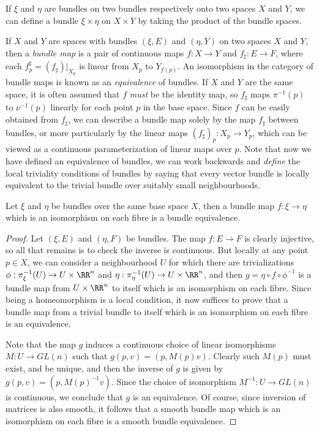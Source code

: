 \begin{example}
    If $\xi$ and $\eta$ are bundles on two bundles respectively onto two spaces $X$ and $Y$, we can define a bundle $\xi \times \eta$ on $X \times Y$ by taking the product of the bundle spaces.
\end{example}

If $X$ and $Y$ are spaces with bundles $(\xi,E)$ and $(\eta,Y)$ on two spaces $X$ and $Y$, then a \emph{bundle map} is a pair of continuous maps $f: X \to Y$ and $f_\sharp: E \to F$, where each $f^\sharp_p = (f_\sharp)|_{X_p}$ is linear from $X_p$ to $Y_{f(p)}$. An isomorphism in the category of bundle maps is known as an \emph{equivalence} of bundles. If $X$ and $Y$ are the same space, it is often assumed that $f$ {\it must} be the identity map, so $f_\sharp$ maps $\pi^{-1}(p)$ to $\nu^{-1}(p)$ linearly for each point $p$ in the base space. Since $f$ can be easily obtained from $f_\sharp$, we can describe a bundle map solely by the map $f_\sharp$ between bundles, or more particularly by the linear maps $(f_\sharp)_p: X_p \to Y_p$, which can be viewed as a continuous parameterization of linear maps over $p$. Note that now we have defined an equivalence of bundles, we can work backwards and {\it define} the local triviality conditions of bundles by saying that every vector bundle is locally equivalent to the trivial bundle over suitably small neighbourhoods.

\begin{theorem}
    Let $\xi$ and $\eta$ be bundles over the same base space $X$, then a bundle map $f: \xi \to \eta$ which is an isomorphism on each fibre is a bundle equivalence.
\end{theorem}
\begin{proof}
    Let $(\xi,E)$ and $(\eta,F)$ be bundles. The map $f: E \to F$ is clearly injective, so all that remains is to check the inverse is continuous. But locally at any point $p \in X$, we can consider a neighbourhood $U$ for which there are trivializations $\phi: \pi_\xi^{-1}(U) \to U \times \RR^n$ and $\eta: \pi_\eta^{-1}(U) \to U \times \RR^n$, and then $g = \eta \circ f \circ \phi^{-1}$ is a bundle map from $U \times \RR^n$ to itself which is an isomorphism on each fibre. Since being a homeomorphism is a local condition, it now suffices to prove that a bundle map from a trivial bundle to itself which is an isomorphism on each fibre is an equivalence.

    Note that the map $g$ induces a continuous choice of linear isomorphisms $M: U \to GL(n)$ such that $g(p,v) = (p,M(p)v)$. Clearly such $M(p)$ must exist, and be unique, and then the inverse of $g$ is given by $g(p,v) = (p,M(p)^{-1} v)$. Since the choice of isomorphism $M^{-1}: U \to GL(n)$ is continuous, we conclude that $g$ is an equivalence. Of course, since inversion of matrices is also smooth, it follows that a smooth bundle map which is an isomorphism on each fibre is a smooth bundle equivalence.
\end{proof}

